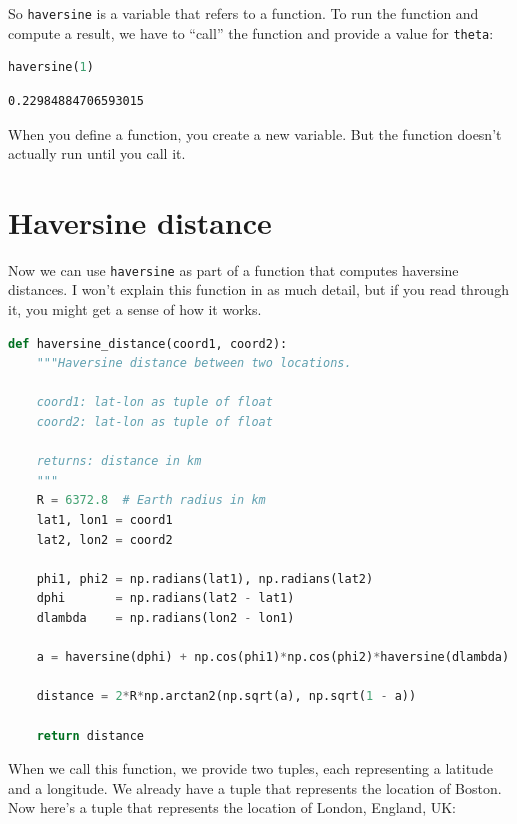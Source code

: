So \passthrough{\lstinline!haversine!} is a variable that refers to a
function. To run the function and compute a result, we have to ``call''
the function and provide a value for \passthrough{\lstinline!theta!}:

\begin{lstlisting}[language=Python,style=source]
haversine(1)
\end{lstlisting}

\begin{lstlisting}[style=output]
0.22984884706593015
\end{lstlisting}

When you define a function, you create a new variable. But the function
doesn't actually run until you call it.

\hypertarget{haversine-distance}{%
\section{Haversine distance}\label{haversine-distance}}

Now we can use \passthrough{\lstinline!haversine!} as part of a function
that computes haversine distances. I won't explain this function in as
much detail, but if you read through it, you might get a sense of how it
works.

\begin{lstlisting}[language=Python,style=source]
def haversine_distance(coord1, coord2):
    """Haversine distance between two locations.
    
    coord1: lat-lon as tuple of float 
    coord2: lat-lon as tuple of float
    
    returns: distance in km
    """
    R = 6372.8  # Earth radius in km
    lat1, lon1 = coord1
    lat2, lon2 = coord2
    
    phi1, phi2 = np.radians(lat1), np.radians(lat2) 
    dphi       = np.radians(lat2 - lat1)
    dlambda    = np.radians(lon2 - lon1)
    
    a = haversine(dphi) + np.cos(phi1)*np.cos(phi2)*haversine(dlambda)
    
    distance = 2*R*np.arctan2(np.sqrt(a), np.sqrt(1 - a))
    
    return distance
\end{lstlisting}

When we call this function, we provide two tuples, each representing a
latitude and a longitude. We already have a tuple that represents the
location of Boston. Now here's a tuple that represents the location of
London, England, UK:

